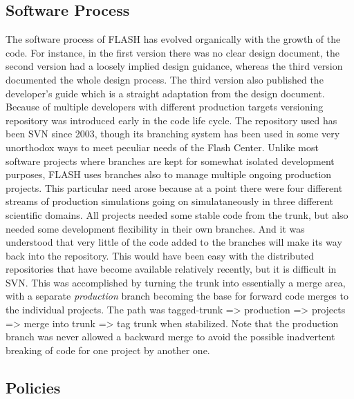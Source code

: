 \subsection{Software Process}
The software process of FLASH has evolved organically with the growth
of the code. For instance, in the first version there was no clear
design document, the second version had a loosely implied design
guidance, whereas the third version documented the whole design
process. The third version also published the developer's guide which
is a straight adaptation from the design document. Because of multiple
developers with different production targets versioning repository was
introduced early in the code life cycle. The repository used has been
SVN since 2003, though its branching system has been used in some very
unorthodox ways to meet peculiar needs of the Flash Center. Unlike
most software projects where branches are kept for somewhat isolated
development purposes, FLASH uses branches also to manage multiple
ongoing production projects. This particular need arose because at a
point there were four different streams of production simulations going
on simulataneously in three different scientific domains. All projects
needed some stable code from the trunk, but also needed some
development flexibility in their own branches. And it was understood
that very little of the code added to the branches will make its way
back into the repository. This would have been easy with the
distributed repositories that have become available relatively
recently, but it is difficult in SVN. This was accomplished by turning
the trunk into essentially a merge area, with a separate {\em
  production} branch becoming the base for forward code merges to the
individual projects. The path was tagged-trunk => production =>
projects => merge into trunk => tag trunk when stabilized. Note that
the production branch was never allowed a backward merge to avoid the
possible inadvertent breaking of code for one project by another one.

\subsection{Policies}